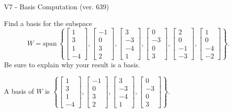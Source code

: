 \begin{exercise}
  \begin{exerciseTitle}V7 - Basis Computation (ver. 639)\end{exerciseTitle}
  \begin{exerciseStatement}
    Find a basis for the subspace 
\[W=\mathrm{span}\ \left\{\left[\begin{array}{r}
1 \\
3 \\
1 \\
-4
\end{array}\right] , \left[\begin{array}{r}
-1 \\
0 \\
3 \\
2
\end{array}\right] , \left[\begin{array}{r}
3 \\
-3 \\
-4 \\
1
\end{array}\right] , \left[\begin{array}{r}
0 \\
-3 \\
0 \\
3
\end{array}\right] , \left[\begin{array}{r}
2 \\
0 \\
-1 \\
-3
\end{array}\right] , \left[\begin{array}{r}
1 \\
0 \\
-4 \\
-2
\end{array}\right]\right\}.\]
 Be sure to explain why your result is a basis.


  \end{exerciseStatement}
  \begin{exerciseAnswer}
   A basis of \(W\) is  \(\left\{\left[\begin{array}{r}
1 \\
3 \\
1 \\
-4
\end{array}\right] , \left[\begin{array}{r}
-1 \\
0 \\
3 \\
2
\end{array}\right] , \left[\begin{array}{r}
3 \\
-3 \\
-4 \\
1
\end{array}\right] , \left[\begin{array}{r}
0 \\
-3 \\
0 \\
3
\end{array}\right]\right\}\).
  


  \end{exerciseAnswer}
\end{exercise}
